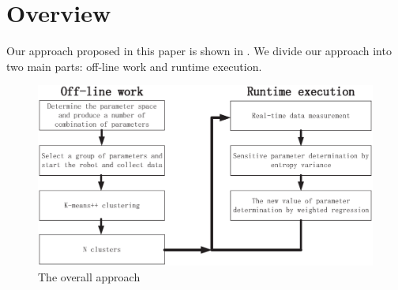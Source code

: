 \section{Overview}
Our approach proposed in this paper is shown in . We divide our approach into two main parts: off-line work and runtime execution.
\begin{figure}[H]
	\centering
	\includegraphics[width=1.1\linewidth]{fig/mainwork/stepMap}
	\caption{The overall approach}
\end{figure}


